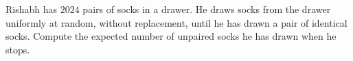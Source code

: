 Rishabh has $2024$ pairs of socks in a drawer. He draws socks from the drawer uniformly at random, without replacement, until he has drawn a pair of identical socks. Compute the expected number of unpaired socks he has drawn when he stops.